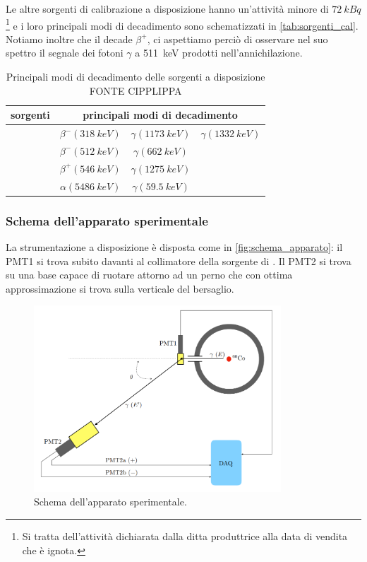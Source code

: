 Le altre sorgenti di calibrazione a disposizione hanno un'attività minore di $\SI{72}{kBq}$\footnote{Si tratta dell'attività dichiarata dalla ditta produttrice alla data di vendita che è ignota.} e i loro principali modi di decadimento sono schematizzati in \autoref{tab:sorgenti_cal}. Notiamo inoltre che il \na\; decade $\beta^+$, ci aspettiamo perciò di osservare nel suo spettro il segnale dei fotoni $\gamma$ a \SI{511}{keV} prodotti nell'annichilazione.

\begin{table}[h]
	\centering
	\begin{tabular}{cccc}
		\toprule
		sorgenti & \multicolumn{3}{c}{principali modi di decadimento} \\
		\midrule
		\co & $\beta^{-} (\SI{318}{keV})$ & $\gamma (\SI{1173}{keV})$ & $\gamma (\SI{1332}{keV})$  \\
		\cs & $\beta^{-} (\SI{512}{keV})$ & $\gamma (\SI{662}{keV})$ \\
		\na & $\beta^{+} (\SI{546}{keV})$ & $\gamma (\SI{1275}{keV})$ \\
		\am & $\alpha (\SI{5486}{keV})$ & $\gamma (\SI{59.5}{keV})$ \\
		\bottomrule
	\end{tabular}
	\caption{\label{tab:sorgenti_cal} Principali modi di decadimento delle sorgenti a disposizione FONTE CIPPLIPPA}
\end{table} 

\subsubsection{Schema dell'apparato sperimentale}
La strumentazione a disposizione è disposta come in \autoref{fig:schema_apparato}: il PMT1 si trova subito davanti al collimatore della sorgente di \co. Il PMT2 si trova su una base capace di ruotare attorno ad un perno che con ottima approssimazione si trova sulla verticale del bersaglio.
 \begin{figure}[h]
	\centering
	\includegraphics[width=25em]{schema_apparato}
	\caption{\label{fig:schema_apparato}Schema dell'apparato sperimentale.}
\end{figure}

